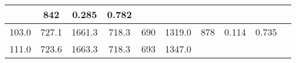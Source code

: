 \documentclass[a4paper,10pt]{article}
\begin{document}
\begin{longtable}{
     |
%    
    c|
%    
    c|
%    
    c|
%    
    c|
%    
    c|
%    
    c|
%    
    c|
%    
    c|
%    
    c|
%    
    c|
%    
    }
%        
        & 842
%        

%        

%        
        & 0.285
%        

%        

%        
        & 0.782
%        

%        
        \\
        \hline

        

%        

%        
        103.0
%        

%        

%        
        & 727.1
%        

%        

%        
        & 1661.3
%        

%        

%        
        & 718.3
%        

%        

%        
        & 690
%        

%        

%        
        & 1319.0
%        

%        

%        
        & 878
%        

%        

%        
        & 0.114
%        

%        

%        
        & 0.735
%        

%        
        \\
        \hline

        

%        

%        
        111.0
%        

%        

%        
        & 723.6
%        

%        

%        
        & 1663.3
%        

%        

%        
        & 718.3
%        

%        

%        
        & 693
%        

%        

%        
        & 1347.0
%        

%        


\end{longtable}
\end{document}

